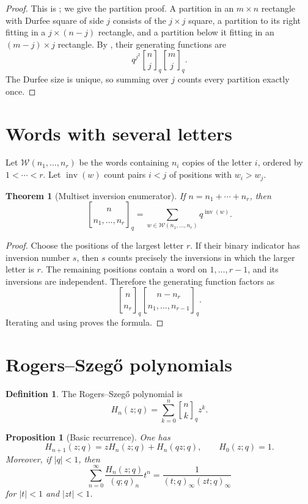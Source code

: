 \documentclass[11pt,oneside,openany]{book}
\newtheorem{theorem}{Theorem}[chapter]
\newtheorem{proposition}[proposition]{Proposition}
\theoremstyle{definition}
\newtheorem{definition}[definition]{Definition}
\theoremstyle{remark}
\newcommand{\qbinom}[2]{\genfrac{[}{]}{0pt}{}{#1}{#2}_{q}}
\newcommand{\Qbinom}[3]{\genfrac{[}{]}{0pt}{}{#1}{#2}_{#3}}
\newcommand{\inv}{\operatorname{inv}}
\newcommand{\abs}[1]{\lvert #1\rvert}
\begin{document}
\begin{proof}
This is ; we give the partition proof.  A partition in an $m\times n$ rectangle with Durfee square of side $j$ consists of the $j\times j$ square, a partition to its right fitting in a $j\times(n-j)$ rectangle, and a partition below it fitting in an $(m-j)\times j$ rectangle.  By , their generating functions are
\[
 q^{j^2}\Qbinom{n}{j}{q}\Qbinom{m}{j}{q}.
\]
The Durfee size is unique, so summing over $j$ counts every partition exactly once.
\end{proof}

\section{Words with several letters}

Let $\mathcal W(n_1,\dots,n_r)$ be the words containing $n_i$ copies of the letter $i$, ordered by $1<\cdots<r$.  Let $\inv(w)$ count pairs $i<j$ of positions with $w_i>w_j$.

\begin{theorem}[Multiset inversion enumerator]\label{thm:qmult-inversions}
If $n=n_1+\cdots+n_r$, then
\[
 \genfrac{[}{]}{0pt}{}{n}{n_1,\dots,n_r}_q
 =\sum_{w\in\mathcal W(n_1,\dots,n_r)}q^{\inv(w)}.
\]
\end{theorem}

\begin{proof}
Choose the positions of the largest letter $r$.  If their binary indicator has inversion number $s$, then $s$ counts precisely the inversions in which the larger letter is $r$.  The remaining positions contain a word on $1,\dots,r-1$, and its inversions are independent.  Therefore the generating function factors as
\[
 \qbinom n{n_r}
 \genfrac{[}{]}{0pt}{}{n-n_r}{n_1,\dots,n_{r-1}}_q.
\]
Iterating and using  proves the formula.
\end{proof}

\section{Rogers--Szeg\H{o} polynomials}

\begin{definition}
The Rogers--Szeg\H{o} polynomial is
\[
 H_n(z;q)=\sum_{k=0}^{n}\qbinom nk z^k.
\]
\end{definition}

\begin{proposition}[Basic recurrence]\label{prop:rogers-szego-recurrence}
One has
\[
 H_{n+1}(z;q)=zH_n(z;q)+H_n(qz;q),
 \qquad H_0(z;q)=1.
\]
Moreover, if $\abs q<1$, then
\[
 \sum_{n=0}^{\infty}\frac{H_n(z;q)}{(q;q)_n}t^n
 =\frac1{(t;q)_\infty(zt;q)_\infty}
\]
for $\abs t<1$ and $\abs{zt}<1$.
\end{proposition}
\end{document}
